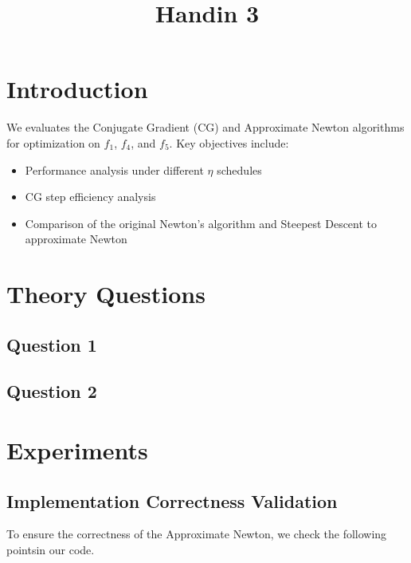 \documentclass[12pt]{article}
\title{Handin 3}
\begin{document}
\maketitle

\section{Introduction}


We evaluates the Conjugate Gradient (CG) and Approximate Newton algorithms for optimization on $f_1$, $f_4$, and $f_5$. Key objectives include:
\begin{itemize}
    \item Performance analysis under different $\eta$ schedules
    \item CG step efficiency analysis
    \item Comparison of the original Newton's algorithm and Steepest Descent to approximate Newton
\end{itemize}


\section{Theory Questions}
\subsection{Question 1}

\subsection{Question 2}


\section{Experiments}

\subsection{Implementation Correctness Validation}

To ensure the correctness of the Approximate Newton, we check the following pointsin our code.
\end{document}

